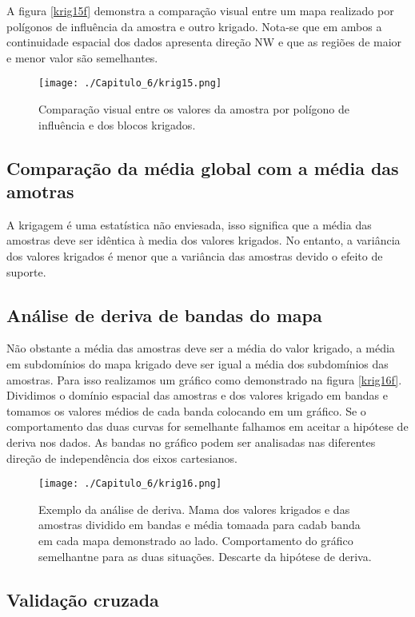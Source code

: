 A figura \eqref{krig15f} demonstra a comparação visual entre um mapa realizado por polígonos de influência da amostra e outro krigado. Nota-se que em ambos a continuidade espacial dos dados apresenta direção NW e que as regiões de maior e menor valor são semelhantes.

\begin{figure}[H]
	\centering
	\texttt{[image: ./Capitulo\_6/krig15.png]}
	\caption{Comparação visual entre os valores da amostra por polígono de influência e dos blocos krigados.}
	\label{krig15f}
\end{figure}

\subsection{Comparação da média global com a média das amotras}

A krigagem é uma estatística não enviesada, isso significa que a média das amostras deve ser idêntica à media dos valores krigados. No entanto, a variância dos valores krigados é menor que a variância das amostras devido o efeito de suporte. 

\subsection{Análise de deriva de bandas do mapa}

Não obstante a média das amostras deve ser a média do valor krigado, a média em subdomínios do mapa krigado deve ser igual a média dos subdomínios das amostras. Para isso realizamos um gráfico como demonstrado na figura \eqref{krig16f}. Dividimos o domínio espacial das amostras e dos valores krigado em bandas e tomamos os valores médios de cada banda colocando em um gráfico. Se o comportamento das duas curvas for semelhante falhamos em aceitar a hipótese de deriva nos dados. As bandas no gráfico podem ser analisadas nas diferentes direção de independência dos eixos cartesianos.


\begin{figure}[H]
	\centering
	\texttt{[image: ./Capitulo\_6/krig16.png]}
	\caption{Exemplo da análise de deriva. Mama dos valores krigados e das amostras dividido em bandas e média tomaada para cadab banda em cada mapa demonstrado ao lado. Comportamento do gráfico semelhantne para as duas situações. Descarte da hipótese de deriva.}
	\label{krig16f}
\end{figure}

\subsection{Validação cruzada}

